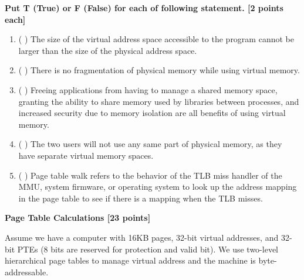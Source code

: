 \documentclass[addpoints, 12pt, answers]{exam}
\begin{document}
\begin{questions}

\question[10] \textbf{Put T (True) or F (False) for each of following statement. [2 points each]}

\begin{enumerate}[(1)]
    \item ( \quad ) The size of the virtual address space accessible to the program cannot be larger than the size of the physical address space.
    \item ( \quad ) There is no fragmentation of physical memory while using virtual memory.
    \item ( \quad ) Freeing applications from having to manage a shared memory space, granting the ability to share memory used by libraries between processes, and increased security due to memory isolation are all benefits of using virtual memory.
    \item ( \quad ) The two users will not use any same part of physical memory, as they have separate virtual memory spaces.
    \item ( \quad ) Page table walk refers to the behavior of the TLB miss handler of the MMU, system firmware, or operating system to look up the address mapping in the page table to see if there is a mapping when the TLB misses.
\end{enumerate}

\pagebreak

\question[23] \textbf{Page Table Calculations [23 points]}

Assume we have a computer with 16KB pages, 32-bit virtual addresses, and 32-bit PTEs (8 bits are reserved for protection and valid bit). We use two-level hierarchical page tables to manage virtual address and the machine is byte-addressable.
\end{questions}
\end{document}
